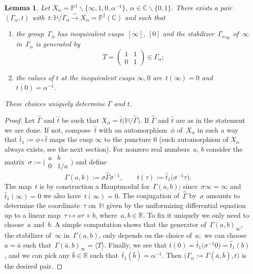\documentclass[pdftex]{sigma}
\newcommand{\C}{\mathbb{C}}
\newcommand{\R}{\mathbb{R}}
\newcommand{\pro}{\mathbb{P}}
\newcommand{\Po}{\mathbb{H}}
\numberwithin{equation}{section}
\newtheorem{Lemma}[Theorem]{Lemma}
\begin{document}
\begin{Lemma}\label{thm:norm}
Let $X_\alpha=\pro^1 \smallsetminus \big\{\infty,1,0,\alpha^{-1}\big\}$, $\alpha\in\C\smallsetminus\{0,1\}$.
There exists a pair~$(\Gamma_\alpha,t)$ with~$t\colon\overline{\Po/\Gamma_\alpha}\overset{\sim}{\rightarrow}\overline{X_\alpha}=\pro^1(\C)$ and such that
\begin{enumerate}\itemsep=0pt
\item[$1)$] the group~$\Gamma_\alpha$ has inequivalent cusps~$[\infty]$, $[0]$ and the stabilizer~${\Gamma_{\alpha}}_\infty$ of~$\infty$ in~$\Gamma_\alpha$ is generated by
\[
T=\begin{pmatrix}
1 & 1\\
0 & 1
\end{pmatrix}\in\Gamma_\alpha ;
\]
\item[$2)$]
the values of $t$ at the inequivalent cusps $\infty,0$ are~$t(\infty)=0$ and $t(0)=\alpha^{-1}$.
\end{enumerate}
These choices uniquely determine $\Gamma$ and $t$.
\end{Lemma}
\begin{proof}
Let $\hat{\Gamma}$ and $\hat{t}$ be such that $X_\alpha=\hat{t}\bigl(\Po/\hat{\Gamma}\bigl)$. If $\hat{\Gamma}$ and $\hat{t}$ are as in the statement we are done. If not, compose~$\hat{t}$ with an automorphism~$\phi$ of~$X_\alpha$ in such a way that $\hat{t}_1:=\phi\circ\hat{t}$ maps the cusp $\infty$ to the puncture $0$ (such automorphism of $X_\alpha$ always exists, see the next section).
For nonzero real numbers~$a$, $b$ consider the matrix~$\sigma:=\bigl(\begin{smallmatrix}
a & b\\
0 & 1/a
\end{smallmatrix}\bigr)$ and define
\[
\Gamma(a,b):=\sigma\hat{\Gamma}\sigma^{-1},\qquad t(\tau):=\hat{t}_1\big(\sigma^{-1}\tau\big) .
\]
The map~$t$ is by construction a Hauptmodul for~$\Gamma(a,b)$; since~$\sigma\infty=\infty$ and~$\hat{t}_1(\infty)=0$ we also have~$t(\infty)=0$.
The conjugation of~$\hat{\Gamma}$ by~$\sigma$ amounts to determine the coordinate~$\tau$ on~$\Po$ given by the uniformizing differential equation up to a linear map~$\tau\mapsto a\tau+b$, where~$a,b\in\R$. To fix it uniquely we only need to choose~$a$ and~$b$.
A simple computation shows that the generator of~$\Gamma(a,b)_\infty$, the stabilizer of~$\infty$ in~$\Gamma(a,b)$, only depends on the choice of~$a;$ we can choose~$a=\bar{a}$ such that~$\Gamma(\bar{a},b)_\infty=\langle{T}\rangle$.
Finally, we see that $t(0)=\hat{t}_1\big(\sigma^{-1}0\big)=\hat{t}_1(b)$, and we can pick any $\bar{b}\in\R$ such that~$\hat{t}_1(\bar{b})=\alpha^{-1}$. Then $\big(\Gamma_\alpha:=\Gamma(\bar{a},\bar{b}),t\big)$ is the desired pair.
\end{proof}
\end{document}
